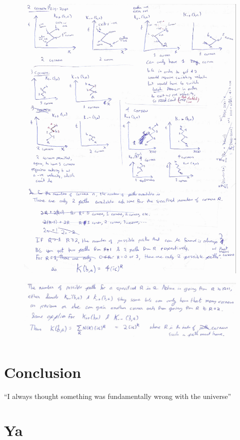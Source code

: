 \documentclass{article}
\begin{document}
\begin{figure}[t]
\includegraphics[width=15cm]{FeynmanQ2dash6p2.png}
\end{figure}

\begin{figure}[t]
\includegraphics[width=15cm]{FeynmanQ2dash6p3.png}
\end{figure}


\section{Conclusion}
``I always thought something was fundamentally wrong with the universe'' \citep{adams1995hitchhiker}

\section{Ya}



\end{document}
